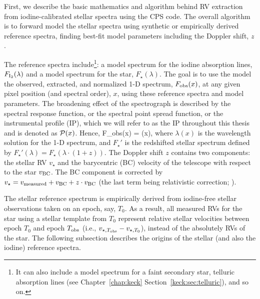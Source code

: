 First, we describe the basic mathematics and algorithm behind RV
extraction from iodine-calibrated stellar spectra using the CPS
code. The overall algorithm is to forward model the stellar spectra
using synthetic or empirically derived reference spectra, finding
best-fit model parameters including the Doppler shift, $z$.

The reference spectra include\footnote{It can also include a model
  spectrum for a faint secondary star, telluric absorption lines (see
  Chapter~\ref{chap:keck} Section~\ref{keck:sec:telluric}), and so
  on.}: a model spectrum for the iodine absorption lines, $F_{\rm
  I_2}(\lambda)$ and a model spectrum for the star,
$F_{\star}(\lambda)$. The goal is to use the model the observed,
extracted, and normalized 1-D spectrum, $F_{\rm obs}(x)$, at any given
pixel position (and spectral order), $x$, using these reference spectra
and model parameters. The broadening effect of the spectrograph is
described by the spectral response function, or the spectral point
spread function, or the instrumental profile (IP), which we will refer
to as the IP throughout this thesis and is denoted as
$\mathcal{P}(x)$. Hence,
\beq
F_{\rm obs}(x) =  \ast \curlyp(x),
\eeq
where $\lambda(x)$ is the wavelength solution for the 1-D spectrum,
and $F_{\star}'$ is the redshifted stellar spectrum defined by
$F_{\star}'(\lambda) = F_{\star}(\lambda\cdot(1+z))$. The Doppler shift $z$
contains two components: the stellar RV $v_{\star}$ and the
barycentric (BC) velocity of the telescope with respect to the star
$v_{\rm BC}$. The BC component is corrected by $v_{\star} = v_{\rm
measured} + v_{\rm BC} + z \cdot v_{\rm BC}$ (the last term being
relativistic correction; \citealt{2014PASP..126..838W}).

The stellar reference spectrum is empirically derived from iodine-free
stellar observations taken on an epoch, say, $T_0$. As a result, all
measured RVs for the star using a stellar template from $T_0$
represent relative stellar velocities between epoch $T_0$ and epoch
$T_{\rm obs}$ (i.e., $v_{\star, T_{\rm obs}} - v_{\star, T_0}$), instead of the
absolutely RVs of the star. The following subsection describes the
origins of the stellar (and also the iodine) reference spectra.



